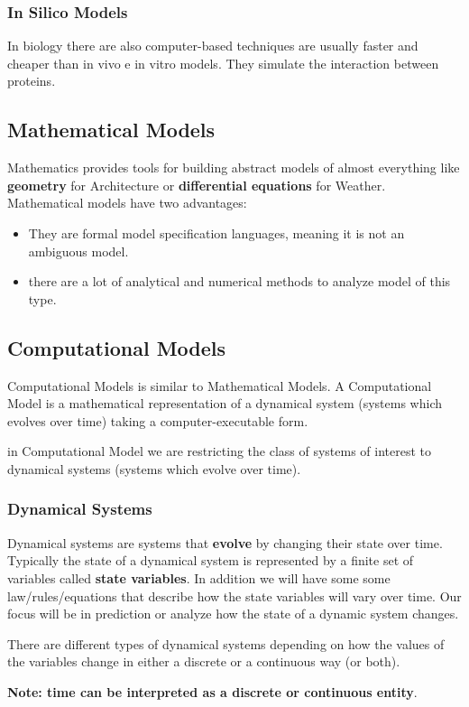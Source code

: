 \subsubsection{In Silico Models}
In biology there are also computer-based techniques are usually faster and cheaper than in vivo e in vitro models. They simulate the interaction between proteins.

\subsection{Mathematical Models}
Mathematics provides tools for building abstract models of almost everything like \textbf{geometry} for Architecture or \textbf{differential equations} for Weather. Mathematical models have two advantages:

\begin{itemize}

\item They are formal model specification languages, meaning it is not an ambiguous model.

\item there are a lot of analytical and numerical methods to analyze model of this type.

\end{itemize}

\subsection{Computational Models}
Computational Models is similar to Mathematical Models. A Computational Model is a mathematical representation of a dynamical system (systems which evolves over time) taking a computer-executable form.
\par in Computational Model we are restricting the class of systems of interest to dynamical systems (systems which evolve over time). 

\subsubsection{Dynamical Systems}
Dynamical systems are systems that \textbf{evolve} by changing their state over time. Typically the state of a dynamical system is represented by a finite set of variables called \textbf{state variables}. In addition we will have some some law/rules/equations that describe how the state variables will vary over time. Our focus will be in prediction or analyze how the state of a dynamic system changes.
\par There are different types of dynamical systems depending on how the values of the variables change in either a discrete or a continuous way (or both).
\par \textbf{Note: time can be interpreted as a discrete or continuous entity}. 

